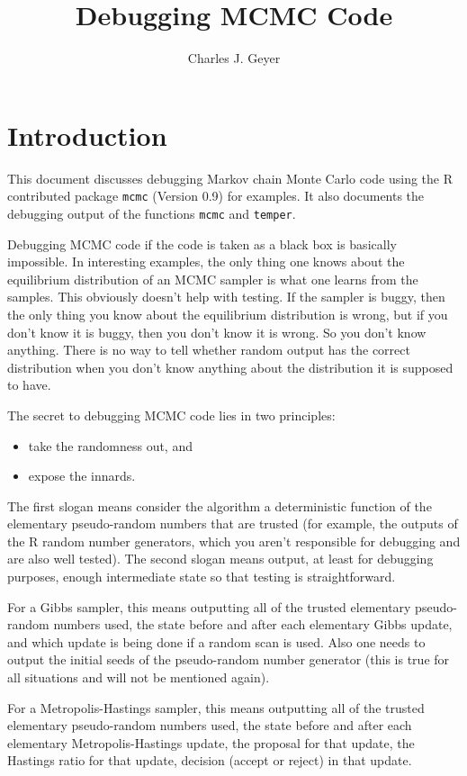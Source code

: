 \documentclass{article}
\begin{document}
\title{Debugging MCMC Code}
\author{Charles J. Geyer}
\maketitle

\section{Introduction}

This document discusses debugging Markov chain Monte Carlo code
using the R contributed package \texttt{mcmc} (Version 0.9)
for examples.  It also documents the debugging output of the functions
\texttt{mcmc} and \texttt{temper}.

Debugging MCMC code if the code is taken as a black box is basically
impossible.  In interesting examples, the only thing one knows about
the equilibrium distribution of an MCMC sampler is what one learns
from the samples.  This obviously doesn't help with testing.  If the
sampler is buggy, then the only thing you know about the equilibrium
distribution is wrong, but if you don't know it is buggy, then you don't
know it is wrong.  So you don't know anything.  There is no way to tell
whether random output has the correct distribution when you don't know
anything about the distribution it is supposed to have.

The secret to debugging MCMC code lies in two principles:
\begin{itemize}
\item take the randomness out, and
\item expose the innards.
\end{itemize}
The first slogan means consider the algorithm a deterministic function
of the elementary pseudo-random numbers that are trusted (for example,
the outputs of the R random number generators, which you aren't responsible
for debugging and are also well tested).
The second slogan means output, at least for debugging purposes, enough
intermediate state so that testing is straightforward.

For a Gibbs sampler, this means outputting all of the trusted elementary
pseudo-random numbers used, the state before and after each elementary
Gibbs update, and which update is being done if a random scan is used.
Also one needs to output the initial seeds of the pseudo-random number
generator (this is true for all situations and will not be mentioned again).

For a Metropolis-Hastings sampler, this means outputting all of the trusted
elementary
pseudo-random numbers used, the state before and after each elementary
Metropolis-Hastings update, the proposal for that update, the Hastings ratio
for that update, decision (accept or reject) in that update.
\end{document}
